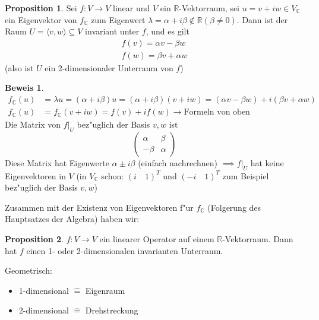 \documentclass[fontsize=11pt,paper=a4,BCOR=0mm,DIV=11,automark,headsepline]{scrbook}
\theoremstyle{remark}
\theoremstyle{definition}
\newtheorem*{proposition}{Proposition}
\theoremstyle{proof}
\newtheorem*{prof}{Beweis}
\theoremstyle{remark}
\begin{document}
\begin{proposition}
  Sei \(f: V\to V\) linear und \(V\) ein \(\mathbb{R}\)-Vektorraum, sei \(u = v + i w \in V_{\mathbb{C}}\) ein Eigenvektor von \(f_{\mathbb{C}}\) zum Eigenwert \(\lambda = \alpha + i \beta \not\in \mathbb{R} (\beta \neq 0)\). Dann ist der Raum \(U = \langle v, w\rangle\subseteq V\) invariant unter \(f\), und es gilt
  \begin{align*}
    f(v) = \alpha v - \beta w\\
    f(w) = \beta v + \alpha w
  \end{align*}
  (also ist \(U\) ein 2-dimensionaler Unterraum von \(f\))
\end{proposition}

\begin{prof}
  \begin{align*}
    f_{\mathbb{C}}(u) &= \lambda u = (\alpha + i \beta) u = (\alpha + i\beta)(v + iw) = (\alpha v - \beta w) + i(\beta v + \alpha w)\\
    f_{\mathbb{C}}(u) &= f_{\mathbb{C}}(v+iw) = f(v) + if(w) \rightarrow \text{Formeln von oben}
  \end{align*}
  Die Matrix von \(f|_U\) bez"uglich der Basis \(v, w\) ist
  \[
    \begin{pmatrix}
      \alpha & \beta \\
      -\beta & \alpha
    \end{pmatrix}
  \]
  Diese Matrix hat Eigenwerte \(\alpha \pm i\beta\) (einfach nachrechnen) \(\implies f|_U\) hat keine Eigenvektoren in \(V\) (in \(V_{\mathbb{C}}\) schon: \((i\quad 1)^T\) und \((-i\quad 1)^T\) zum Beispiel bez"uglich der Basis \(v, w\))
\end{prof}

Zusammen mit der Existenz von Eigenvektoren f"ur $f_{\mathbb{C}}$ (Folgerung des Hauptsatzes der Algebra) haben wir:

\begin{proposition}
  \(f: V\to V\) ein linearer Operator auf einem $\mathbb{R}$-Vektorraum. Dann hat $f$ einen 1-
  oder 2-dimensionalen invarianten Unterraum.
\end{proposition}

\begin{relation}
  Geometrisch:
  \begin{itemize}
  \item 1-dimensional \(\hat{=}\) Eigenraum
  \item 2-dimensional \(\hat{=}\) Drehstreckung
  \end{itemize}
\end{relation}
\end{document}
